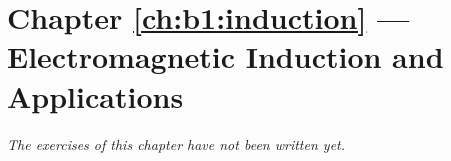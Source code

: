 \section*{Chapter \ref{ch:b1:induction} --- Electromagnetic Induction and Applications}


\emph{The exercises of this chapter have not been written yet.}
